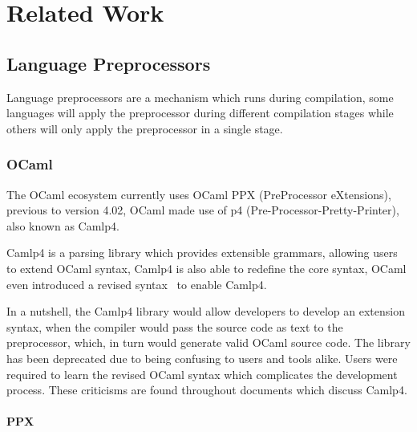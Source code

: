 

\chapter{Related Work}\label{cha:related-work}

\section{Language Preprocessors}\label{sec:lang-preprocessors}
Language preprocessors are a mechanism which runs during compilation,
some languages will apply the preprocessor during different compilation stages while others will only apply the preprocessor in a single stage.

\subsection{OCaml}\label{sec:lang-preprocessors:ocaml}

The OCaml ecosystem currently uses OCaml PPX (PreProcessor eXtensions),
previous to version 4.02, OCaml made use of p4 (Pre-Processor-Pretty-Printer), also known as Camlp4.

Camlp4 is a parsing library which provides extensible grammars,
allowing users to extend OCaml syntax,
Camlp4 is also able to redefine the core syntax,
OCaml even introduced a revised syntax~\autocite{Rauglaudre2003} to enable Camlp4.

In a nutshell, the Camlp4 library would allow developers to develop an extension syntax,
when the compiler would pass the source code as text to the preprocessor,
which, in turn would generate valid OCaml source code.
The library has been deprecated due to being confusing to users and tools alike.
Users were required to learn the revised OCaml syntax which complicates the development process.
These criticisms are found throughout documents which discuss Camlp4.

\subsubsection*{PPX}\label{sec:lang-preprocessors:ocaml:ppx}

